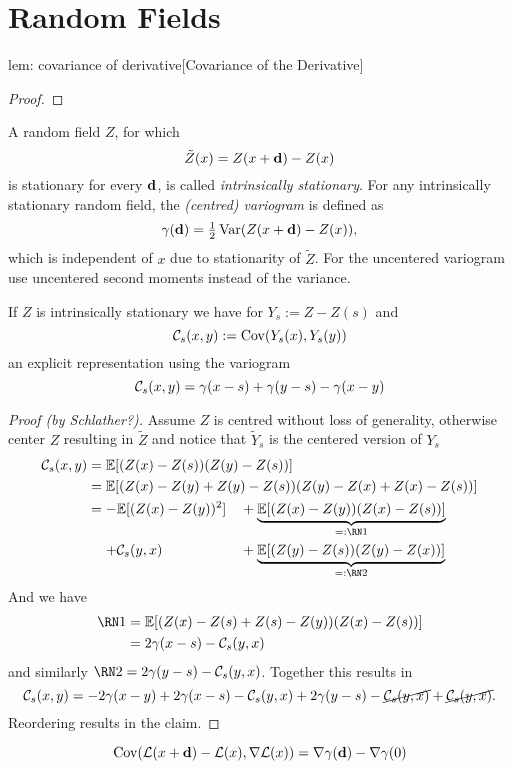 \section{Random Fields}

\begin{replemma}{lem: covariance of derivative}[Covariance of the Derivative]
	
\end{replemma}
\begin{proof}
	
\end{proof}

\begin{definition}[Variogram]
	A random field \(Z\), for which
	\[
		\tilde{Z}(x) = Z(x+\mathbf{d})- Z(x)
	\]
	is stationary for every \(\mathbf{d}\), is called \emph{intrinsically stationary}.
	For any intrinsically stationary random field, the \emph{(centred) variogram} is
	defined as
	\[
		\gamma(\mathbf{d})	= \tfrac12\operatorname{Var}(Z(x+\mathbf{d})-Z(x)),
	\]
	which is independent of \(x\) due to stationarity of \(\tilde{Z}\). For the
	uncentered variogram use uncentered second moments instead of the variance.
\end{definition}

\begin{lemma}
	If \(Z\) is intrinsically stationary we have for \(Y_s := Z - Z(s)\)
	and
	\[
		\mathcal{C}_s(x,y) := \operatorname{Cov}(Y_s(x), Y_s(y))
	\]
	an explicit representation using the variogram
	\[
		\mathcal{C}_s(x,y) = \gamma(x-s) + \gamma(y-s) - \gamma(x-y)
	\]
\end{lemma}
\begin{proof}[Proof (by Schlather?)]
	Assume \(Z\) is centred without loss of generality, otherwise center \(Z\)
	resulting in \(\tilde{Z}\) and notice that \(\tilde{Y}_s\) is the centered
	version of \(Y_s\)
	\begin{align*}
		\C_s(x,y) 
		&= \E[(Z(x) - Z(s))(Z(y)-Z(s))]\\
		&= \E[(Z(x) - Z(y) + Z(y) - Z(s))(Z(y) - Z(x) + Z(x) - Z(s))]\\
		&=\begin{aligned}[t]
			-&\E[(Z(x) - Z(y))^2] &&+ \underbrace{\E[(Z(x)-Z(y))(Z(x)-Z(s))]}_{=:\Rom{1}}\\
			+&\C_s(y,x)	&&+ \underbrace{\E[(Z(y) - Z(s))(Z(y) - Z(x))]}_{=:\Rom{2}}
		\end{aligned}
	\end{align*}
	And we have
	\begin{align*}
		\Rom{1}
		&=\E[(Z(x)- Z(s) + Z(s) - Z(y))(Z(x) - Z(s))]\\
		&= 2\variogram(x-s) - \C_s(y,x)
	\end{align*}
	and similarly \(\Rom{2} = 2\variogram(y-s) - \C_s(y,x)\). Together this
	results in
	\[
		\mathcal{C}_s(x,y) = -2\gamma(x-y) + 2\gamma(x-s) - \mathcal{C}_s(y,x) + 2\gamma(y-s) - \cancel{\mathcal{C}_s(y,x)} + \cancel{\mathcal{C}_s(y,x)}.
	\]
	Reordering results in the claim.
\end{proof}

\begin{lemma}
	\[
		\operatorname{Cov}(\mathcal{L}(x+\mathbf{d})-\mathcal{L}(x), \nabla\mathcal{L}(x)) = \nabla\gamma(\mathbf{d}) - \nabla\gamma(0)
	\]
\end{lemma}